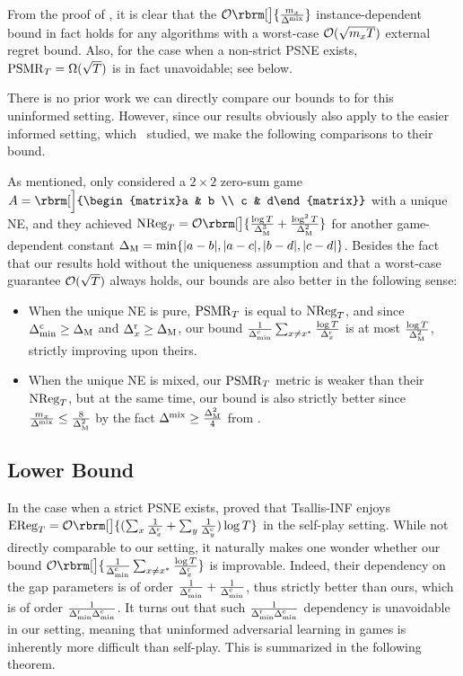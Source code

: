 From the proof of , it is clear that the $\order\rbrm[\big]{\frac{m_x}{\DeltaMix}}$ instance-dependent bound in fact holds for any algorithms with a worst-case $\mathcal{O}(\sqrt{m_x T})$ external regret bound.
Also, for the case when a non-strict PSNE exists, $\mathrm{PSMR}_T=\Omega(\sqrt{T})$ is in fact unavoidable; see  below.

There is no prior work we can directly compare our bounds to for this uninformed setting.
However, since our results obviously also apply to the easier informed setting, which~\citet{maiti2025limitations} studied, we make the following comparisons to their bound.


As mentioned, \citet{maiti2025limitations} only considered a $2\times 2$ zero-sum game $A=\rbrm[\Big]{\begin{matrix}a & b \\ c & d\end{matrix}}$ with a unique NE,
and they achieved $\NR_T = \order\rbrm[\big]{\frac{\log T}{\DeltaEntry^3}+\frac{\log^2 T}{\DeltaEntry^2}}$ for another game-dependent constant $\Delta_{\mathrm{M}}=\min\{|a-b|,|a-c|,|b-d|,|c-d|\}$.
Besides the fact that our results hold without the uniqueness assumption and that a worst-case guarantee  $\mathcal{O}(\sqrt{T})$ always holds, our bounds are also better in the following sense:
\begin{itemize}[itemsep=2pt,topsep=2pt]
    \item When the unique NE is pure, $\mathrm{PSMR}_T$ is equal to $\mathrm{NReg}_T$, and since $\Delta^{\mathrm{c}}_{\mathrm{min}}\geq \Delta_{\mathrm{M}}$ and $\Delta^{\mathrm{r}}_x\geq \Delta_{\mathrm{M}}$, our bound $\frac{1}{\Delta^{\mathrm{c}}_{\mathrm{min}}} \sum_{x\neq x^*} \frac{\log T}{\Delta^{\mathrm{r}}_x}$ is at most $\frac{\log T}{\Delta_{\mathrm{M}}^2}$, strictly improving upon theirs.
    \item When the unique NE is mixed, our $\mathrm{PSMR}_T$ metric is weaker than their $\mathrm{NReg}_T$, but at the same time, our bound is also strictly better since $\frac{m_x}{\Delta^{\mkern-1mu\mathrm{mix}}}\leq\frac{8}{\Delta_{\mathrm{M}}^2}$ by the fact $\Delta^{\mkern-1mu\mathrm{mix}} \geq \frac{\Delta_{\mathrm{M}}^2}{4}$ from .
\end{itemize}


\subsection{Lower Bound}\label{h2:uninformed-lb}




In the case when a strict PSNE exists, \citet{ito2025instancedependent} proved that Tsallis-INF enjoys $\ER_T=\order\rbrm[\big]{(\sum_x \frac{1}{\DeltaR_x}+\sum_y \frac{1}{\DeltaC_y})\log T}$ in the self-play setting.
While not directly comparable to our setting, it naturally makes one wonder whether our bound $\order\rbrm[\big]{\frac{1}{\DCmin} \sum_{x\neq x^*} \frac{\log T}{\DeltaR_x}}$ is improvable.
Indeed, their dependency on the gap parameters is of order $\frac{1}{\Delta^{\mathrm{r}}_{\mathrm{min}}}+\frac{1}{\Delta^{\mathrm{c}}_{\mathrm{min}}}$, thus strictly better than ours, which is of order $\frac{1}{\Delta^{\mathrm{r}}_{\mathrm{min}}\Delta^{\mathrm{c}}_{\mathrm{min}}}$.
It turns out that such $\frac{1}{\Delta^{\mathrm{r}}_{\mathrm{min}}\Delta^{\mathrm{c}}_{\mathrm{min}}}$ dependency is unavoidable in our setting, meaning that uninformed adversarial learning in games is inherently more difficult than self-play. This is summarized in the following theorem.



